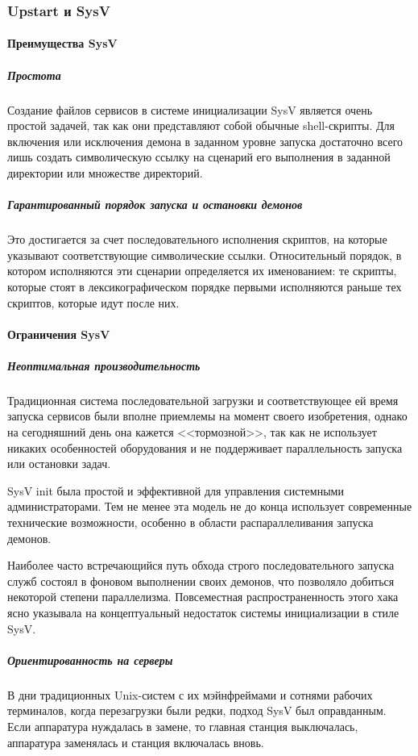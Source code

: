 \subsubsection{Upstart и SysV}
\paragraph{Преимущества SysV}
\subparagraph{Простота}
Создание файлов сервисов в системе инициализации SysV является очень простой задачей, так как они представляют собой обычные shell-скрипты. Для включения или исключения демона в заданном уровне запуска достаточно всего лишь создать символическую ссылку на сценарий его выполнения в заданной директории или множестве директорий.
\subparagraph{Гарантированный порядок запуска и остановки демонов}
Это достигается за счет последовательного исполнения скриптов, на которые указывают соответствующие символические ссылки. Относительный порядок, в котором исполняются эти сценарии определяется их именованием: те скрипты, которые стоят в лексикографическом порядке первыми исполняются раньше тех скриптов, которые идут после них.
\paragraph{Ограничения SysV}
\subparagraph{Неоптимальная производительность}
Традиционная система последовательной загрузки и соответствующее ей время запуска сервисов были вполне приемлемы на момент своего изобретения, однако на сегодняшний день она кажется <<тормозной>>, так как не использует никаких особенностей оборудования и не поддерживает параллельность запуска или остановки задач.

SysV init была простой и эффективной для управления системными администраторами. Тем не менее эта модель не до конца использует современные технические возможности, особенно в области распараллеливания запуска демонов.

Наиболее часто встречающийся путь обхода строго последовательного запуска служб состоял в фоновом выполнении своих демонов, что позволяло добиться некоторой степени параллелизма. Повсеместная распространенность этого хака ясно указывала на концептуальный недостаток системы инициализации в стиле SysV.  
\subparagraph{Ориентированность на серверы}
В дни традиционных Unix-систем с их мэйнфреймами и сотнями рабочих терминалов, когда перезагрузки были редки, подход SysV был оправданным. Если аппаратура нуждалась в замене, то главная станция выключалась, аппаратура заменялась и станция включалась вновь. 

